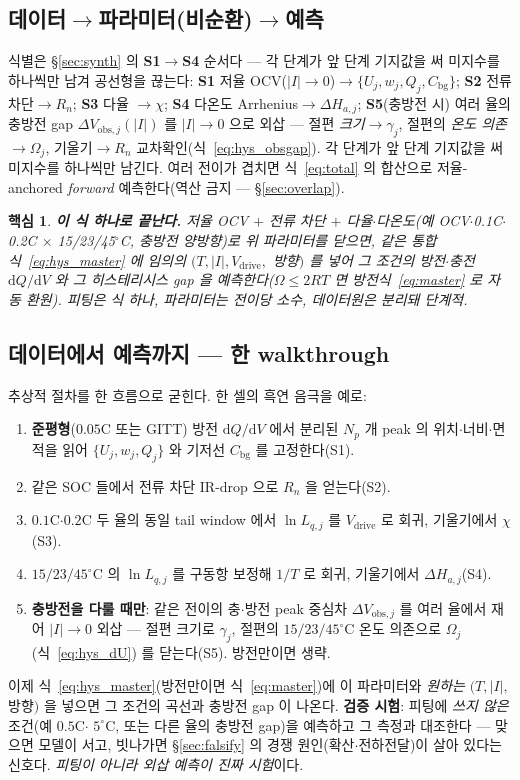 \documentclass[11pt,a4paper]{article}
\newtheorem*{keybox}{핵심}
\newcommand{\dd}{\mathrm{d}}
\newcommand{\drive}{\mathrm{drive}}
\newcommand{\bg}{\mathrm{bg}}
\begin{document}
\subsection{데이터$\to$파라미터(비순환)$\to$예측}
식별은 \S\ref{sec:synth} 의 \textbf{S1$\to$S4} 순서다 — 각 단계가 앞 단계 기지값을 써 미지수를 하나씩만 남겨 공선형을 끊는다:
\textbf{S1} 저율 OCV($|I|\!\to\!0$)$\to\{U_j,w_j,Q_j,C_\bg\}$; \textbf{S2} 전류 차단$\to R_n$; \textbf{S3} 다율
$\to\chi$; \textbf{S4} 다온도 Arrhenius$\to\Delta H_{a,j}$; \textbf{S5}(충방전 시) 여러 율의 충방전 gap
$\Delta V_{\mathrm{obs},j}(|I|)$ 를 $|I|\!\to\!0$ 으로 외삽 — 절편 \emph{크기}$\to\gamma_j$, 절편의 \emph{온도 의존}
$\to\Omega_j$, 기울기$\to R_n$ 교차확인(식~\eqref{eq:hys_obsgap}). 각 단계가 앞 단계 기지값을 써 미지수를
하나씩만 남긴다. 여러 전이가 겹치면 식~\eqref{eq:total} 의 합산으로 저율-anchored \emph{forward} 예측한다(역산
금지 — \S\ref{sec:overlap}).
\begin{keybox}
\textbf{이 식 하나로 끝난다.} 저율 OCV $+$ 전류 차단 $+$ 다율$\cdot$다온도(예 OCV$\cdot$0.1C$\cdot$0.2C $\times$
15/23/45$^\circ$C, 충방전 양방향)로 위 파라미터를 닫으면, \emph{같은 통합식~\eqref{eq:hys_master} 에 임의의}
$(T,|I|,V_\drive,$ 방향$)$ 를 넣어 그 조건의 \emph{방전$\cdot$충전} $\dd Q/\dd V$ 와 그 히스테리시스 gap 을
\emph{예측}한다($\Omega\le2RT$ 면 방전식~\eqref{eq:master} 로 자동 환원). 피팅은 식 하나, 파라미터는 전이당 소수,
데이터원은 분리돼 단계적.
\end{keybox}

\subsection{데이터에서 예측까지 — 한 walkthrough}
추상적 절차를 한 흐름으로 굳힌다. 한 셀의 흑연 음극을 예로:
\begin{enumerate}[label=\textbf{\arabic*.},leftmargin=2.0em,itemsep=1pt]
\item \textbf{준평형}($0.05$C 또는 GITT) 방전 $\dd Q/\dd V$ 에서 분리된 $N_p$ 개 peak 의 위치$\cdot$너비$\cdot$면적을
  읽어 $\{U_j,w_j,Q_j\}$ 와 기저선 $C_\bg$ 를 고정한다(S1).
\item 같은 SOC 들에서 전류 차단 IR-drop 으로 $R_n$ 을 얻는다(S2).
\item $0.1$C$\cdot$$0.2$C 두 율의 동일 tail window 에서 $\ln L_{q,j}$ 를 $V_\drive$ 로 회귀, 기울기에서 $\chi$(S3).
\item $15/23/45^\circ$C 의 $\ln L_{q,j}$ 를 구동항 보정해 $1/T$ 로 회귀, 기울기에서 $\Delta H_{a,j}$(S4).
\item \textbf{충방전을 다룰 때만}: 같은 전이의 충$\cdot$방전 peak 중심차 $\Delta V_{\mathrm{obs},j}$ 를 여러 율에서 재어
  $|I|\to0$ 외삽 — 절편 크기로 $\gamma_j$, 절편의 $15/23/45^\circ$C 온도 의존으로 $\Omega_j$(식~\eqref{eq:hys_dU})
  를 닫는다(S5). 방전만이면 생략.
\end{enumerate}
이제 식~\eqref{eq:hys_master}(방전만이면 식~\eqref{eq:master})에 이 파라미터와 \emph{원하는} $(T,|I|,$ 방향$)$ 을
넣으면 그 조건의 곡선과 충방전 gap 이 나온다. \textbf{검증 시험}: 피팅에 \emph{쓰지 않은} 조건(예 $0.5$C$\cdot$
$5^\circ$C, 또는 다른 율의 충방전 gap)을 예측하고 그 측정과 대조한다 — 맞으면 모델이 서고, 빗나가면
\S\ref{sec:falsify} 의 경쟁 원인(확산$\cdot$전하전달)이 살아 있다는 신호다. \emph{피팅이 아니라 외삽 예측이 진짜 시험}이다.
\end{document}
